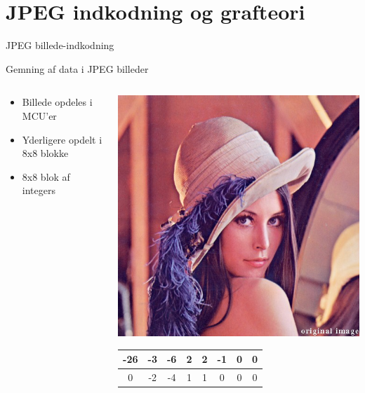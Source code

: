 \section{JPEG indkodning og grafteori}

\begin{frame}{JPEG billede-indkodning}{}
	\begin{center}
	\end{center}
\end{frame}

\begin{frame}{Gemning af data i JPEG billeder}{}
	\begin{minipage}[0.5\textheight]{\textwidth}
		\begin{columns}[T]
			\begin{column}{0.5\textwidth}
				\vspace{.56mm}
				\begin{itemize}
					\item Billede opdeles i MCU'er
					\item Yderligere opdelt i 8x8 blokke
					\item 8x8 blok af integers
				\end{itemize}
			\end{column}
			\begin{column}{0.5\textwidth}
				\begin{center}
					\includegraphics[width=.5\textwidth]{figures/lena_color.jpg}
				\end{center}
				{\tiny \begin{table}[]
						\centering
						\begin{tabular}{|c|c|c|c|c|c|c|c|}
							\hline
							-26 & -3 & -6 & 2  & 2  & -1 & 0 & 0 \\ \hline
							0   & -2 & -4 & 1  & 1  & 0  & 0 & 0 \\ \hline

\end{tabular}
\end{table}}
\end{column}
\end{columns}
\end{minipage}
\end{frame}
